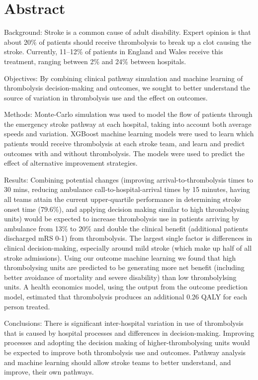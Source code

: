 \section*{Abstract}

Background: Stroke is a common cause of adult disability. Expert opinion is that about 20\% of patients should receive thrombolysis to break up a clot causing the stroke. Currently, 11–12\% of patients in England and Wales receive this treatment, ranging between 2\% and 24\% between hospitals.

Objectives: By combining clinical pathway simulation and machine learning of thrombolysis decision-making and outcomes, we sought to better understand the source of variation in thrombolysis use and the effect on outcomes.

Methods: Monte-Carlo simulation was used to model the flow of patients through the emergency stroke pathway at each hospital, taking into account both average speeds and variation. XGBoost machine learning models were used to learn which patients would receive thrombolysis at each stroke team, and learn and predict outcomes with and without thrombolysis. The models were used to predict the effect of alternative improvement strategies.

Results: Combining potential changes (improving arrival-to-thrombolysis times to 30 mins, reducing ambulance call-to-hospital-arrival times by 15 minutes, having all teams attain the current upper-quartile performance in determining stroke onset time (79.6\%), and applying decision making similar to high thrombolysing units) would be expected to increase thrombolysis use in patients arriving by ambulance from 13\% to 20\% and double the clinical benefit (additional patients discharged mRS 0-1) from thrombolysis. The largest single factor is differences in clinical decision-making, especially around mild stroke (which make up half of all stroke admissions). Using our outcome machine learning we found that high thrombolysing units are predicted to be generating more net benefit (including better avoidance of mortality and severe disability) than low thrombolylsing units. A health economics model, using the output from the outcome prediction model, estimated that thrombolysis produces an additional 0.26 QALY for each person treated.

Conclusions: There is significant inter-hospital variation in use of thrombolysis that is caused by hospital processes and differences in decision-making. Improving processes and adopting the decision making of higher-thrombolysing units would be expected to improve both thrombolysis use and outcomes. Pathway analysis and machine learning should allow stroke teams to better understand, and improve, their own pathways.

